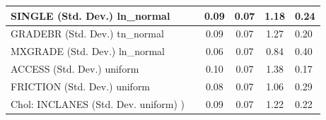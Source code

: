 \begin{table}
\begin{center}
\begin{tabular}{|l|l|c|c|c|l|}
			\hline
			SINGLE (Std. Dev.) ln_normal &  & 0.09 & 0.07 & 1.18 & 0.24 \\
			\hline
			GRADEBR (Std. Dev.) tn_normal &  & 0.09 & 0.07 & 1.27 & 0.20 \\
			\hline
			MXGRADE (Std. Dev.) ln_normal &  & 0.06 & 0.07 & 0.84 & 0.40 \\
			\hline
			ACCESS (Std. Dev.) uniform &  & 0.10 & 0.07 & 1.38 & 0.17 \\
			\hline
			FRICTION (Std. Dev.) uniform &  & 0.08 & 0.07 & 1.06 & 0.29 \\
			\hline
			 Chol: INCLANES (Std. Dev. uniform) ) &  & 0.09 & 0.07 & 1.22 & 0.22 \\
			\hline
		\end{tabular}
	\end{center}
\end{table}